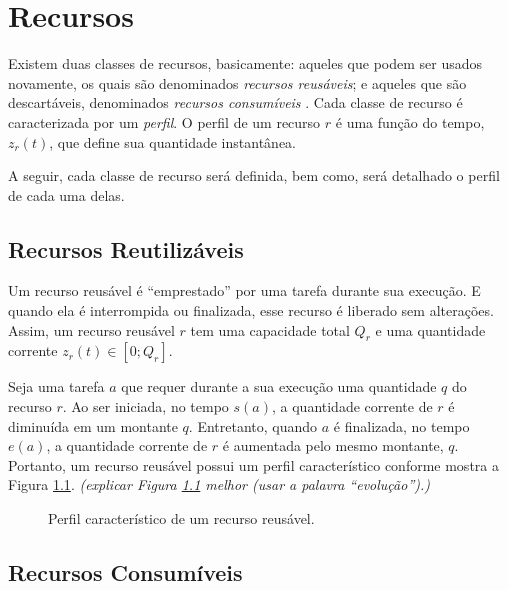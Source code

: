 \chapter[Recursos]{Recursos} \label{cap:recursos}

    Existem duas classes de recursos, basicamente: aqueles que podem ser usados novamente, os quais são denominados \textit{recursos reusáveis}; e aqueles que são descartáveis, denominados \textit{recursos consumíveis} \cite{ref:ghallab2004automated}. Cada classe de recurso é caracterizada por um \textit{perfil}. O perfil de um recurso $r$ é uma função do tempo, $z_r(t)$, que define sua quantidade instantânea.
    
    A seguir, cada classe de recurso será definida, bem como, será detalhado o perfil de cada uma delas.
    
    \section{Recursos Reutilizáveis} \label{sec:recurso_reusavel}
    
        Um recurso reusável é ``emprestado'' por uma tarefa durante sua execução. E quando ela é interrompida ou finalizada, esse recurso é liberado sem alterações. Assim, um recurso reusável $r$ tem uma capacidade total $Q_r$ e uma quantidade corrente $z_r(t) \in [0; Q_r]$. 
        
        Seja uma tarefa $a$ que requer durante a sua execução uma quantidade $q$ do recurso $r$. Ao ser iniciada, no tempo $s(a)$, a quantidade corrente de $r$ é diminuída em um montante $q$. Entretanto, quando $a$ é finalizada, no tempo $e(a)$, a quantidade corrente de $r$ é aumentada pelo mesmo montante, $q$. Portanto, um recurso reusável possui um perfil característico conforme mostra a Figura \ref{fig:recurso_reusavel}. \emph{\color{red} (explicar Figura \ref{fig:recurso_reusavel} melhor (usar a palavra ``evolução'').)}
        
        \begin{figure}
            \centering
            
            \caption{Perfil característico de um recurso reusável.} \label{fig:recurso_reusavel}
        \end{figure}
    
    \section{Recursos Consumíveis} \label{sec:recurso_consumivel}
    
